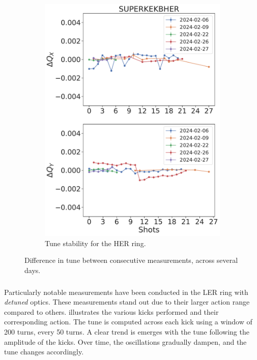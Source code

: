 \begin{figure}[!htb]
\begin{subfigure}[b]{0.48\textwidth}
        \includegraphics[width=\linewidth]{images/kek/SUPERKEKBHER_shots.pdf}
        \caption{Tune stability for the HER ring.}
    \end{subfigure}
    \caption{Difference in tune between consecutive measurements, across several days.}
    \label{fig:kek:shots}
\end{figure}


\FloatBarrier
\subsubsection{}

Particularly notable measurements have been conducted in the LER ring with \textit{detuned} optics.
These measurements stand out due to their larger action range compared to others.
 illustrates the various kicks performed and their corresponding
action.
The tune is computed across each kick using a window of 200 turns, every 50 turns. A clear trend is
emerges with the tune following the amplitude of the kicks. Over time, the oscillations gradually
dampen, and the tune changes accordingly.

